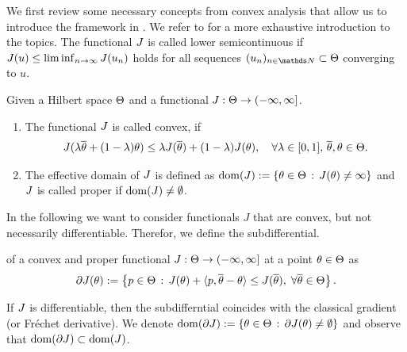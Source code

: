 We first review some necessary concepts from convex analysis that allow us to introduce the framework in \cite{bungert2022bregman}. We refer to \cite{benning2018modern, rockafellar1997convex, bauschke2011convex} for a more exhaustive introduction to the topics.
%
The functional $J$ is called lower semicontinuous if $J(u)\leq\liminf_{n\to\infty}J(u_n)$ holds for all sequences $(u_n)_{n\in\N}\subset\Param$ converging to $u$.
%
\begin{definition}{}{}
Given a Hilbert space $\Theta$ and a functional $J:\Theta\to(-\infty,\infty]$.
%
\begin{enumerate}
\item The functional $J$ is called convex, if
%
\begin{align}
    J(\lambda\overline{\theta}+(1-\lambda)\theta)\leq
    \lambda J(\overline{\theta})
    +(1-\lambda)J(\theta),\quad\forall\lambda\in[0,1],\,\overline{\theta},\theta\in\Theta.
\end{align}
%
\item The effective domain of $J$ is defined as $\operatorname{dom}(J):=\{\theta\in\Theta\,:\,J(\theta)\neq\infty\}$ and $J$ is called proper if $\operatorname{dom}(J)\neq\emptyset$.
\end{enumerate} 
\end{definition}
%
%
In the following we want to consider functionals $J$ that are convex, but not necessarily differentiable. Therefor, we define the subdifferential.
%
\begin{definition}{}{}
of a convex {and proper} functional $J:\Theta\to(-\infty,\infty]$ at a point $\theta\in\Theta$ as
\begin{align}
\label{eq:subgrad}
    \partial J(\theta) := \left\lbrace p\in\Theta \,:\, J(\theta) + \langle p,\overline{\theta}-\theta \rangle \leq J(\overline{\theta}),\;\forall\overline{\theta}\in\Theta\right\rbrace.
\end{align}
\end{definition}
If $J$ is differentiable, then the subdifferntial coincides with the classical gradient (or Fr\'echet derivative). We denote $\operatorname{dom}(\partial J):=\{\theta\in\Theta\,:\,\partial J(\theta)\neq\emptyset\}$ and observe that $\operatorname{dom}(\partial J)\subset\operatorname{dom}(J)$.


